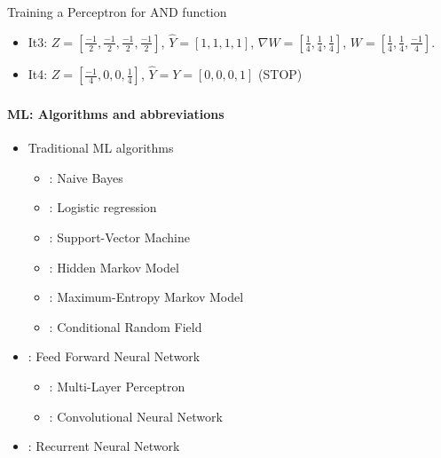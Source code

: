 \documentclass[xcolor=table]{beamer}
\begin{document}
\begin{frame}
\begin{exampleblock}{Training a Perceptron for AND function}
\begin{minipage}{0.79\textwidth}
\begin{itemize}
				\item It3: $ Z = [\frac{-1}{2}, \frac{-1}{2}, \frac{-1}{2}, \frac{-1}{2}] $, 
				$ \hat{Y} = [1, 1, 1, 1] $, 
				$ \nabla W = [\frac{1}{4}, \frac{1}{4}, \frac{1}{4}] $,
				$ W = [\frac{1}{4}, \frac{1}{4}, \frac{-1}{4}] $.
				
				\item It4: $ Z = [\frac{-1}{4}, 0, 0, \frac{1}{4}] $, 
				$ \hat{Y} = Y = [0, 0, 0, 1] $ (STOP)
			\end{itemize}
		\end{minipage}
	\end{exampleblock}
	
\end{frame}

\begin{frame}
	\frametitle{\inserttitle}
	\framesubtitle{ML: Algorithms and abbreviations}
	
	\begin{itemize}
		\item Traditional ML algorithms
		\begin{itemize}
			\item {}: Naive Bayes
			\item {}: Logistic regression
			\item {}: Support-Vector Machine
			\item {}: Hidden Markov Model
			\item {}: Maximum-Entropy Markov Model
			\item {}: Conditional Random Field
		\end{itemize}
		\item {}: Feed Forward Neural Network
		\begin{itemize}
			\item {}: Multi-Layer Perceptron
			\item {}: Convolutional Neural Network
		\end{itemize} 
		\item {}: Recurrent Neural Network
	\end{itemize}
	
\end{frame}
\end{document}
